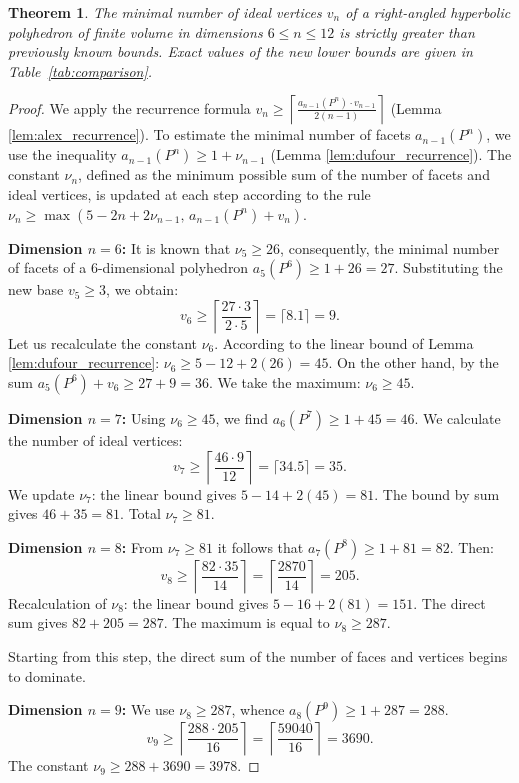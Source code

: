 \documentclass[12pt]{amsart}
\newtheorem{theorem}{Theorem}[section]
\theoremstyle{definition}
\begin{document}
	\begin{theorem} \label{thm:higher_dims}
		The minimal number of ideal vertices $v_n$ of a right-angled hyperbolic polyhedron of finite volume in dimensions $6 \le n \le 12$ is strictly greater than previously known bounds. Exact values of the new lower bounds are given in Table~\ref{tab:comparison}.
	\end{theorem}
	
	\begin{proof}
		We apply the recurrence formula $v_n \ge \left\lceil \frac{a_{n-1}(P^n) \cdot v_{n-1}}{2(n-1)} \right\rceil$ (Lemma \ref{lem:alex_recurrence}). To estimate the minimal number of facets $a_{n-1}(P^n)$, we use the inequality $a_{n-1}(P^n) \ge 1 + \nu_{n-1}$ (Lemma \ref{lem:dufour_recurrence}). The constant $\nu_n$, defined as the minimum possible sum of the number of facets and ideal vertices, is updated at each step according to the rule $\nu_n \ge \max(5 - 2n + 2\nu_{n-1}, \, a_{n-1}(P^n) + v_n)$.
		
		\textbf{Dimension $n=6$:} It is known that $\nu_5 \ge 26$, consequently, the minimal number of facets of a 6-dimensional polyhedron $a_5(P^6) \ge 1 + 26 = 27$. Substituting the new base $v_5 \ge 3$, we obtain:
		$$v_6 \ge \left\lceil \frac{27 \cdot 3}{2 \cdot 5} \right\rceil = \lceil 8.1 \rceil = 9.$$
		Let us recalculate the constant $\nu_6$. According to the linear bound of Lemma \ref{lem:dufour_recurrence}: $\nu_6 \ge 5 - 12 + 2(26) = 45$. On the other hand, by the sum $a_5(P^6) + v_6 \ge 27 + 9 = 36$. We take the maximum: $\nu_6 \ge 45$.
		
		\textbf{Dimension $n=7$:} Using $\nu_6 \ge 45$, we find $a_6(P^7) \ge 1 + 45 = 46$. We calculate the number of ideal vertices:
		$$v_7 \ge \left\lceil \frac{46 \cdot 9}{12} \right\rceil = \lceil 34.5 \rceil = 35.$$
		We update $\nu_7$: the linear bound gives $5 - 14 + 2(45) = 81$. The bound by sum gives $46 + 35 = 81$. Total $\nu_7 \ge 81$.
		
		\textbf{Dimension $n=8$:} From $\nu_7 \ge 81$ it follows that $a_7(P^8) \ge 1 + 81 = 82$. Then:
		$$v_8 \ge \left\lceil \frac{82 \cdot 35}{14} \right\rceil = \left\lceil \frac{2870}{14} \right\rceil = 205.$$
		Recalculation of $\nu_8$: the linear bound gives $5 - 16 + 2(81) = 151$. The direct sum gives $82 + 205 = 287$. The maximum is equal to $\nu_8 \ge 287$.
		
		Starting from this step, the direct sum of the number of faces and vertices begins to dominate.
		
		\textbf{Dimension $n=9$:} We use $\nu_8 \ge 287$, whence $a_8(P^9) \ge 1 + 287 = 288$.
		$$v_9 \ge \left\lceil \frac{288 \cdot 205}{16} \right\rceil = \left\lceil \frac{59040}{16} \right\rceil = 3690.$$
		The constant $\nu_9 \ge 288 + 3690 = 3978$.
		

\end{proof}
\end{document}
